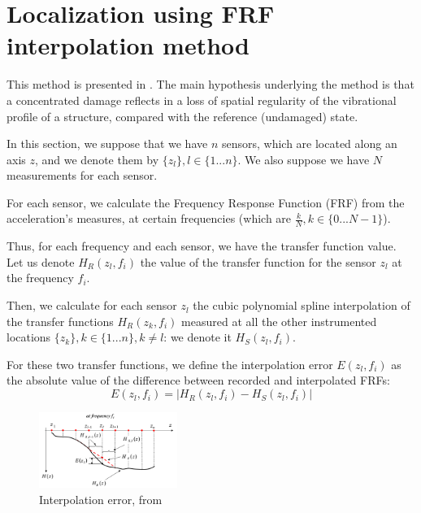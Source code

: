 \documentclass[journal]{IEEEtran}
\begin{document}


\section{Localization using FRF interpolation method}


This method is presented in \cite{dilena2015damage}.
The main hypothesis underlying the method is that a concentrated damage reflects in a loss of spatial regularity of the
vibrational profile of a structure, compared with the reference (undamaged) state.

In this section, we suppose that we have $n$ sensors, which are located along an axis $z$, and we denote them by
$\{z_l\}, l\in \{1 ... n\}$. We also suppose we have $N$ measurements for each sensor.

For each sensor, we calculate the Frequency Response Function (FRF) from the acceleration's measures, at certain frequencies 
(which are $\frac{k}{N}, k \in \{0 ... N-1\}$).

Thus, for each frequency and each sensor, we have the transfer function value. Let us denote $H_R(z_l,f_i)$ the value of the transfer function for  the sensor $z_l$ at the frequency $f_i$.

Then, we calculate for each sensor $z_l$ the cubic polynomial spline interpolation of the transfer functions $H_R(z_k,f_i)$ measured at all 
the other instrumented locations $\{z_k\}, k\in \{1 ... n\}, k \neq l$: we denote it $H_S(z_l,f_i)$.

For these two transfer functions, we define the interpolation error $E(z_l,f_i)$ as the absolute value of the difference between recorded and interpolated FRFs:
\begin{equation}
E(z_l,f_i) = | H_R(z_l,f_i) - H_S(z_l,f_i) |
\end{equation}


\begin{figure}[h!]
  \centering
  \includegraphics[width=0.4\textwidth]{images/interpolation.png}
  \caption{Interpolation error, from \cite{dilena2015damage}}
  \label{interpolation_error}
\end{figure}
\end{document}
